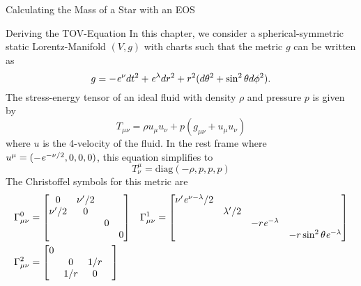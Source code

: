 \begin{section}{Calculating the Mass of a Star with an EOS}
\begin{subsection}{Deriving the TOV-Equation}
\label{3-Mass-TOVDerivation}
In this chapter, we consider a spherical-symmetric static Lorentz-Manifold \cite{choquet-bruhatIntroductionGeneralRelativity2015} $(V,g)$ with charts such that the metric $g$ can be written as
\begin{equation}
	g=-\mathit{e}^\nu dt^2+\mathit{e}^\lambda dr^2 + r^2(d\theta^2+\sin^2\theta d\phi^2).
\end{equation}
The stress-energy tensor of an ideal fluid \cite{choquet-bruhatIntroductionGeneralRelativity2015} with density $\rho$ and pressure $p$ is given by
\begin{equation}
	T_{\mu\nu}=\rho u_\mu u_\nu + p(g_{\mu\nu}+u_\mu u_\nu)
\end{equation}
where $u$ is the 4-velocity of the fluid. In the rest frame where $u^\mu=(-\mathit{e}^{-\nu/2},0,0,0)$, this equation simplifies to
\begin{equation}
	T^\mu_\nu=\text{diag}(-\rho,p,p,p)
\end{equation}
The Christoffel symbols \cite{choquet-bruhatIntroductionGeneralRelativity2015} for this metric are
\begin{align}
	\Gamma_{\mu\nu}^0 &= \begin{bmatrix}
	                     	0 & \nu'/2 & & \\
	                     	\nu'/2 & 0 & & \\
	                     	& & 0 &\\
	                     	& & & 0
	                     \end{bmatrix}\hspace{0.3cm}
	\Gamma_{\mu\nu}^1 = \begin{bmatrix}
	                     	\nu'\mathit{e}^{\nu-\lambda}/2 & & &\\
	                     	& \lambda'/2 & & \\
	                     	& & -r\mathit{e}^{-\lambda} & \\
	                     	& & & -r\sin^2\theta\mathit{e}^{-\lambda}
	                     \end{bmatrix}\\
	\Gamma_{\mu\nu}^2 &= \begin{bmatrix}
	                     	0 & & &\\
	                     	& 0 & 1/r &\\
	                     	& 1/r & 0 &\\

\end{bmatrix}
\end{align}
\end{subsection}
\end{section}
